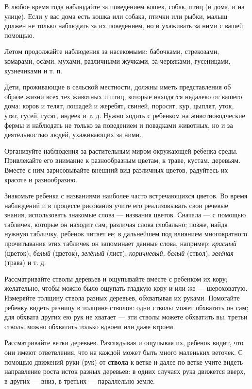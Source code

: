 \documentclass{book}
\renewcommand{\emph}[1]{\textit{#1}}
\begin{document}
В любое время года наблюдайте за поведением кошек, собак, птиц (и дома,
и на улице). Если у вас дома есть кошка или собака, птички или рыбки,
малыш должен не только наблюдать за их поведением, но и ухаживать за
ними с вашей помощью.

Летом продолжайте наблюдения за насекомыми: бабочками, стрекозами,
комарами, осами, мухами, различными жучками, за червяками, гусеницами,
кузнечиками и т. п.

Дети, проживающие в сельской местности, должны иметь представления об
образе жизни всех тех животных и птиц, которые находятся недалеко от
вашего дома: коров и телят, лошадей и жеребят, свиней, поросят, кур,
цыплят, уток, утят, гусей, гусят, индеек и т. д. Нужно ходить с ребенком
на животноводческие фермы и наблюдать не только за поведением и
повадками животных, но и за деятельностью людей, ухаживающих за ними.

Организуйте наблюдения за растительным миром окружающей ребенка среды.
Привлекайте его внимание к разнообразным цветам, к траве, кустам,
деревьям. Вместе с ним зарисовывайте внешний вид различных цветов,
радуйтесь их красоте и разнообразию.

Знакомьте ребенка с названиями наиболее часто встречающихся цветов. Во
время наблюдений и в процессе рисования учите его реализовывать свои
речевые знания, использовать знакомые слова --- названия цветов. Сначала
--- с помощью табличек, которые он находит сам, различая слова
глобально; позже, найдя нужную табличку, ребенок читает ее; в дальнейшем
под влиянием многократного прочитывания этих табличек он запоминает
данные слова, например: \emph{красный} (цветок), \emph{белый} (цветок),
\emph{зелёный} (лист), \emph{коричневый, белый} (ствол), \emph{зелёная}
(трава) и т. д.

Рассматривайте стволы деревьев и ощупывайте вместе с ребенком их кору;
желательно, чтобы можно было ощупать гладкую кору и или же ---
шероховатую. Измеряйте толщину ствола разных деревьев, обхватывая их
руками. Помогайте ребенку видеть разницу в толщине стволов: одни стволы
может обхватить он сам; для обхвата других ею рук не хватает --- эти
стволы можете обхватить вы, третьи стволы можно обхватить только вдвоем
или даже втроем.

Рассматривайте ветки деревьев. Разглядывая и ощупывая их, ребенок видит,
что они имеют ответвления, что на каждой может быть много маленьких
веточек. С помощью движений руки (рук) от \textbf{ствола} к ветке и
далее по ветке учите видеть направление роста исток разных деревьев: в
одних случаях рука движется вверх, в других --- вниз, в третьих ---
параллельно земле.
\end{document}

